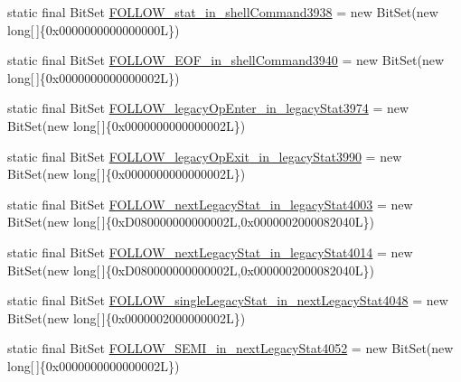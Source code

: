 \begin{DoxyCompactItemize}
\item 
static final Bit\-Set \hyperlink{classorg_1_1tzi_1_1use_1_1parser_1_1testsuite_1_1_test_suite_parser_abe8543db915dc487753c7c511de147b2}{F\-O\-L\-L\-O\-W\-\_\-stat\-\_\-in\-\_\-shell\-Command3938} = new Bit\-Set(new long\mbox{[}$\,$\mbox{]}\{0x0000000000000000\-L\})
\item 
static final Bit\-Set \hyperlink{classorg_1_1tzi_1_1use_1_1parser_1_1testsuite_1_1_test_suite_parser_a458c874400e6ebb86f604a9b6744b7fe}{F\-O\-L\-L\-O\-W\-\_\-\-E\-O\-F\-\_\-in\-\_\-shell\-Command3940} = new Bit\-Set(new long\mbox{[}$\,$\mbox{]}\{0x0000000000000002\-L\})
\item 
static final Bit\-Set \hyperlink{classorg_1_1tzi_1_1use_1_1parser_1_1testsuite_1_1_test_suite_parser_a71f58f1eb9be9ec8f4efcdd2db2dfe1e}{F\-O\-L\-L\-O\-W\-\_\-legacy\-Op\-Enter\-\_\-in\-\_\-legacy\-Stat3974} = new Bit\-Set(new long\mbox{[}$\,$\mbox{]}\{0x0000000000000002\-L\})
\item 
static final Bit\-Set \hyperlink{classorg_1_1tzi_1_1use_1_1parser_1_1testsuite_1_1_test_suite_parser_a9c5193ec9404c9c8c38ac389a4c640e7}{F\-O\-L\-L\-O\-W\-\_\-legacy\-Op\-Exit\-\_\-in\-\_\-legacy\-Stat3990} = new Bit\-Set(new long\mbox{[}$\,$\mbox{]}\{0x0000000000000002\-L\})
\item 
static final Bit\-Set \hyperlink{classorg_1_1tzi_1_1use_1_1parser_1_1testsuite_1_1_test_suite_parser_ae8059ea238b329b8a8a1f40f62c68865}{F\-O\-L\-L\-O\-W\-\_\-next\-Legacy\-Stat\-\_\-in\-\_\-legacy\-Stat4003} = new Bit\-Set(new long\mbox{[}$\,$\mbox{]}\{0x\-D080000000000002\-L,0x0000002000082040\-L\})
\item 
static final Bit\-Set \hyperlink{classorg_1_1tzi_1_1use_1_1parser_1_1testsuite_1_1_test_suite_parser_a4f5c752cdb65e7491ec478172d41a3e1}{F\-O\-L\-L\-O\-W\-\_\-next\-Legacy\-Stat\-\_\-in\-\_\-legacy\-Stat4014} = new Bit\-Set(new long\mbox{[}$\,$\mbox{]}\{0x\-D080000000000002\-L,0x0000002000082040\-L\})
\item 
static final Bit\-Set \hyperlink{classorg_1_1tzi_1_1use_1_1parser_1_1testsuite_1_1_test_suite_parser_ad1973b42497c0dd37e9159e2982618c6}{F\-O\-L\-L\-O\-W\-\_\-single\-Legacy\-Stat\-\_\-in\-\_\-next\-Legacy\-Stat4048} = new Bit\-Set(new long\mbox{[}$\,$\mbox{]}\{0x0000002000000002\-L\})
\item 
static final Bit\-Set \hyperlink{classorg_1_1tzi_1_1use_1_1parser_1_1testsuite_1_1_test_suite_parser_ac3a69bfc9cd3e3c5a0dbc030643d8883}{F\-O\-L\-L\-O\-W\-\_\-\-S\-E\-M\-I\-\_\-in\-\_\-next\-Legacy\-Stat4052} = new Bit\-Set(new long\mbox{[}$\,$\mbox{]}\{0x0000000000000002\-L\})

\end{DoxyCompactItemize}
